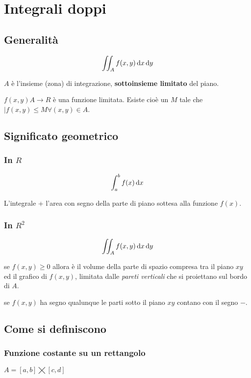 \chapter{Integrali doppi}

\section{Generalità}

$$\iint_A f(x,y) \mathop{}\!\mathrm{d} x \mathop{}\!\mathrm{d} y$$

$A$ è l'insieme (zona) di integrazione, \textbf{sottoinsieme limitato} del piano.

$f(x,y) A\to R$ è una funzione limitata. Esiste cioè un $M$ tale che $|f(x,y) \leq M \forall (x,y) \in A$.

\section{Significato geometrico}

\subsection{In $R$}

$$\int_a^b f(x) \mathop{}\!\mathrm{d} x$$

L'integrale + l'area con segno della parte di piano sottesa alla funzione $f(x)$.

\subsection{In $R^2$}

$$\iint_A f(x,y) \mathop{}\!\mathrm{d} x \mathop{}\!\mathrm{d} y$$

se $f(x,y) \ge 0$ allora è il volume della parte di spazio compresa tra il piano $xy$ ed il grafico di $f(x,y)$, limitata dalle \textit{pareti verticali} che si proiettano sul bordo di $A$.

se $f(x,y)$ ha segno qualunque le parti sotto il piano $xy$ contano con il segno $-$.

\section{Come si definiscono}

\subsection{Funzione costante su un rettangolo}

$A= [a,b] \bigtimes [c,d]$

